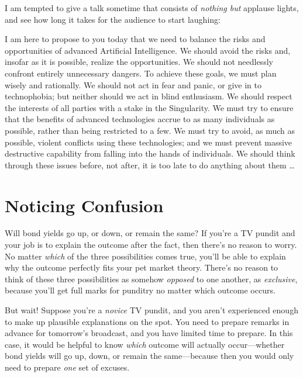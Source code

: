 {
 I am tempted to give a talk sometime that consists of
\textit{nothing but} applause lights, and see how long it takes for the
audience to start laughing:}

{
 I am here to propose to you today that we need to balance the
risks and opportunities of advanced Artificial Intelligence. We should
avoid the risks and, insofar as it is possible, realize the
opportunities. We should not needlessly confront entirely unnecessary
dangers. To achieve these goals, we must plan wisely and rationally. We
should not act in fear and panic, or give in to technophobia; but
neither should we act in blind enthusiasm. We should respect the
interests of all parties with a stake in the Singularity. We must try
to ensure that the benefits of advanced technologies accrue to as many
individuals as possible, rather than being restricted to a few. We must
try to avoid, as much as possible, violent conflicts using these
technologies; and we must prevent massive destructive capability from
falling into the hands of individuals. We should think through these
issues before, not after, it is too late to do anything about them
\ldots}

\myendsectiontext

\chapter{Noticing Confusion}


{
 Will bond yields go up, or down, or remain the same? If
you're a TV pundit and your job is to explain the
outcome after the fact, then there's no reason to
worry. No matter \textit{which} of the three possibilities comes true,
you'll be able to explain why the outcome perfectly
fits your pet market theory. There's no reason to think
of these three possibilities as somehow \textit{opposed} to one
another, as \textit{exclusive}, because you'll get full
marks for punditry no matter which outcome occurs. }

{
 But wait! Suppose you're a \textit{novice} TV
pundit, and you aren't experienced enough to make up
plausible explanations on the spot. You need to prepare remarks in
advance for tomorrow's broadcast, and you have limited
time to prepare. In this case, it would be helpful to know
\textit{which} outcome will actually occur---whether bond yields will
go up, down, or remain the same---because then you would only need to
prepare \textit{one} set of excuses.}

